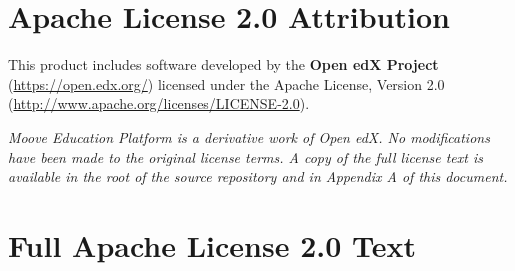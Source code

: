 \newpage
\section*{Apache License 2.0 Attribution}
This product includes software developed by the \textbf{Open edX Project} (\url{https://open.edx.org/}) licensed under the Apache License, Version 2.0 (\url{http://www.apache.org/licenses/LICENSE-2.0}).

\textit{Moove Education Platform is a derivative work of Open edX. No modifications have been made to the original license terms. A copy of the full license text is available in the root of the source repository and in Appendix A of this document.}

\appendix
\section{Full Apache License 2.0 Text}


